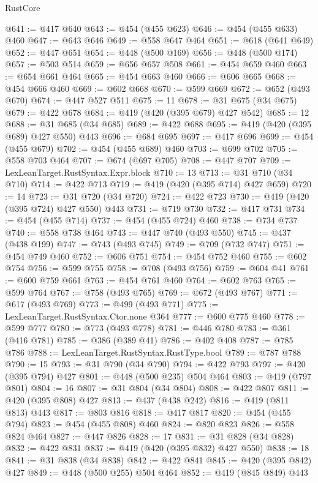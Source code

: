 \begin{lexlean}{RustCore}
\begin{coremodule}
@641 := @417 @640
@643 := @454 (@455 @623)
@646 := @454 (@455 @633) @460
@647 := @643 @646
@649 := @558 @647 @464
@651 := @618 (@641 @649)
@652 := @447 @651
@654 := @448 (@500 @169)
@656 := @448 (@500 @174)
@657 := @503 @514
@659 := @656 @657 @508
@661 := @454 @659 @460
@663 := @654 @661 @464
@665 := @454 @663 @460
@666 := @606 @665
@668 := @454 @666 @460
@669 := @602 @668
@670 := @599 @669
@672 := @652 (@493 @670)
@674 := @447 @527 @511
@675 := 11
@678 := @31 @675 (@34 @675)
@679 := @422 @678
@684 := @419 (@420 (@395 @679) @427 @542)
@685 := 12
@688 := @31 @685 (@34 @685)
@689 := @422 @688
@695 := @419 (@420 (@395 @689) @427 @550) @443
@696 := @684 @695
@697 := @417 @696
@699 := @454 (@455 @679)
@702 := @454 (@455 @689) @460
@703 := @699 @702
@705 := @558 @703 @464
@707 := @674 (@697 @705)
@708 := @447 @707
@709 := LexLeanTarget.RustSyntax.Expr.block
@710 := 13
@713 := @31 @710 (@34 @710)
@714 := @422 @713
@719 := @419 (@420 (@395 @714) @427 @659)
@720 := 14
@723 := @31 @720 (@34 @720)
@724 := @422 @723
@730 := @419 (@420 (@395 @724) @427 @550) @443
@731 := @719 @730
@732 := @417 @731
@734 := @454 (@455 @714)
@737 := @454 (@455 @724) @460
@738 := @734 @737
@740 := @558 @738 @464
@743 := @447 @740 (@493 @550)
@745 := @437 (@438 @199)
@747 := @743 (@493 @745)
@749 := @709 (@732 @747)
@751 := @454 @749 @460
@752 := @606 @751
@754 := @454 @752 @460
@755 := @602 @754
@756 := @599 @755
@758 := @708 (@493 @756)
@759 := @604 @41
@761 := @600 @759 @661
@763 := @454 @761 @460
@764 := @602 @763
@765 := @599 @764
@767 := @758 (@493 @765)
@769 := @672 (@493 @767)
@771 := @617 (@493 @769)
@773 := @499 (@493 @771)
@775 := LexLeanTarget.RustSyntax.Ctor.none @364
@777 := @600 @775 @460
@778 := @599 @777
@780 := @773 (@493 @778)
@781 := @446 @780
@783 := @361 (@416 @781)
@785 := @386 (@389 @41)
@786 := @402 @408
@787 := @785 @786
@788 := LexLeanTarget.RustSyntax.RustType.bool
@789 := @787 @788
@790 := 15
@793 := @31 @790 (@34 @790)
@794 := @422 @793
@797 := @420 (@395 @794) @427
@801 := @448 (@500 @235) @504 @464
@803 := @419 (@797 @801)
@804 := 16
@807 := @31 @804 (@34 @804)
@808 := @422 @807
@811 := @420 (@395 @808) @427
@813 := @437 (@438 @242)
@816 := @419 (@811 @813) @443
@817 := @803 @816
@818 := @417 @817
@820 := @454 (@455 @794)
@823 := @454 (@455 @808) @460
@824 := @820 @823
@826 := @558 @824 @464
@827 := @447 @826
@828 := 17
@831 := @31 @828 (@34 @828)
@832 := @422 @831
@837 := @419 (@420 (@395 @832) @427 @550)
@838 := 18
@841 := @31 @838 (@34 @838)
@842 := @422 @841
@845 := @420 (@395 @842) @427
@849 := @448 (@500 @255) @504 @464
@852 := @419 (@845 @849) @443

\end{coremodule}
\end{lexlean}
